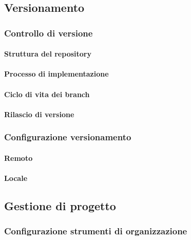 \subsection{Versionamento}
	
\subsubsection{Controllo di versione}
	
\paragraph{Struttura del repository}
\paragraph{Processo di implementazione}
\paragraph{Ciclo di vita dei branch}
\paragraph{Rilascio di versione}

\subsubsection{Configurazione versionamento}

\paragraph{Remoto}
\paragraph{Locale}
		
\subsection{Gestione di progetto}

\subsubsection{Configurazione strumenti di organizzazione}
